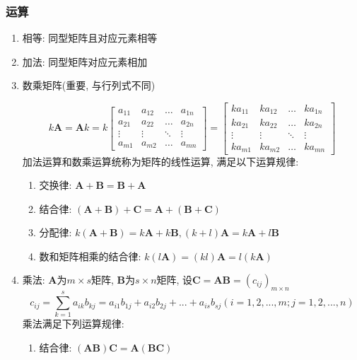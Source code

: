 \subsubsection{运算}
\begin{enumerate}
	\item 相等: 同型矩阵且对应元素相等
	\item 加法: 同型矩阵对应元素相加
	\item 数乘矩阵(重要, 与行列式不同)\par 
	\begin{equation*}
		k\bm{A} = \bm{A}k = k \begin{bmatrix}
		a_{11}	& a_{12}  & \dots & a_{1n} \\
		a_{21}	& a_{22} & \dots & a_{2n} \\
		\vdots	& \vdots & \ddots & \vdots \\
		a_{m1}	& a_{m2} & \dots & a_{mn} 
		\end{bmatrix} = 
	    \begin{bmatrix}
	    ka_{11}	& ka_{12}  & \dots & ka_{1n} \\
	    ka_{21}	& ka_{22} & \dots & ka_{2n} \\
	    \vdots	& \vdots & \ddots & \vdots \\
	    ka_{m1}	& ka_{m2} & \dots & ka_{mn} 
	    \end{bmatrix}
	\end{equation*}
    加法运算和数乘运算统称为矩阵的线性运算, 满足以下运算规律:
    \begin{enumerate}
	\item 交换律: $ \bm{A}+\bm{B}=\bm{B}+\bm{A} $
	\item 结合律: $ (\bm{A}+\bm{B})+\bm{C}=\bm{A}+(\bm{B}+\bm{C}) $
	\item 分配律: $ k(\bm{A}+\bm{B})=k\bm{A}+k\bm{B}, (k+l)\bm{A}=k\bm{A}+l\bm{B} $
	\item 数和矩阵相乘的结合律: $ k(l\bm{A})=(kl)\bm{A}=l(k\bm{A}) $
    \end{enumerate}
    \item 乘法: $ \bm{A} $为$ m\times s $矩阵, $ \bm{B} $为$ s\times n $矩阵, 设$ \bm{C}=\bm{A}\bm{B}=(c_{ij})_{m\times n} $
    \begin{equation*}
    	c_{ij}=\sum_{k=1}^{s}a_{ik}b_{kj}=a_{i1}b_{1j}+a_{i2}b_{2j}+...+a_{is}b_{sj}(i=1,2,...,m;j=1,2,...,n)
    \end{equation*}
    乘法满足下列运算规律:
    \begin{enumerate}
    	\item 结合律: $ (\bm{A}\bm{B})\bm{C}=\bm{A}(\bm{B}\bm{C}) $

\end{enumerate}
\end{enumerate}
